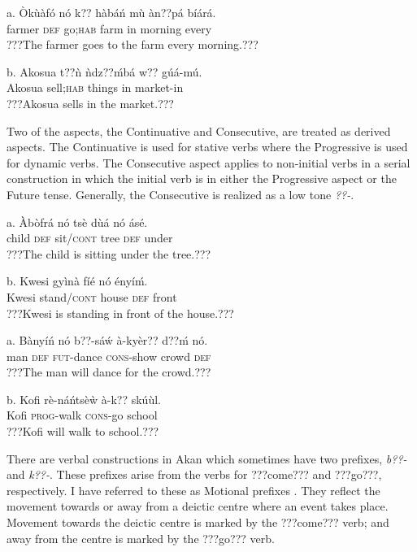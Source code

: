 \documentclass[output=paper]{langsci/langscibook}
\begin{document}
\ea
\gll a.  \`{O}k\`{u}àfó  nó   k??    hàbáń  m\`{u}  àn??pá    bíárá.\\
       farmer  \textsc{def}  go;\textsc{hab}    farm  in  morning  every\\
\glt ???The farmer goes to the farm every morning.???
\z

\ea
\gll b.  Akosua    t??ǹ     ǹdz??ḿbá  w??  gúá-mú.\\
       Akosua  sell;\textsc{hab}  things    in  market-in\\
\glt ???Akosua sells in the market.???
\z

Two of the aspects, the Continuative and Consecutive, are treated as derived aspects. The Continuative is used for stative verbs where the Progressive is used for dynamic verbs. The Consecutive aspect applies to non-initial verbs in a serial construction in which the initial verb is in either the Progressive aspect or the Future tense. Generally, the Consecutive is realized as a low tone \emph{??-}.

\ea
\gll a.  \`{A}bòfrá  nó  tsè    d\`{u}á  nó  ásé.\\
       child  \textsc{def}  sit/\textsc{cont}  tree  \textsc{def}  under\\
\glt ???The child is sitting under the tree.???
\z

\ea
\gll b.  Kwesi  gyìnà    fíé  nó  ényíḿ.\\
       Kwesi  stand/\textsc{cont}  house  \textsc{def}  front\\
\glt ???Kwesi is standing in front of the house.???
\z

\ea
\gll a.  Bànyíń  nó  b??-sá\'{w}   à-kyèr??    d??ḿ  nó.\\
       man  \textsc{def}  \textsc{fut}{}-dance  \textsc{cons}{}-show  crowd  \textsc{def}\\
\glt   ???The man will dance for the crowd.???
\z

\ea
\gll   b.  Kofi  rè-náńtsèẁ  à-k??    skú\`{u}l.\\
       Kofi  \textsc{prog}{}-walk  \textsc{cons}{}-go  school\\
\glt   ???Kofi will walk to school.???
\z

There are verbal constructions in Akan which sometimes have two prefixes, \emph{b??-} and \emph{k??-}. These prefixes arise from the verbs for ???come??? and ???go???, respectively. I have referred to these as Motional prefixes \citep{Osam2002}. They reflect the movement towards or away from a deictic centre where an event takes place. Movement towards the deictic centre is marked by the ???come??? verb; and away from the centre is marked by the ???go??? verb. 
\end{document}
